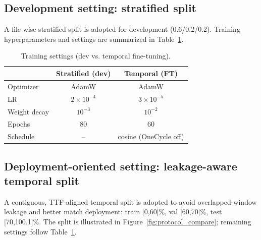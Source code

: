 \documentclass[pdflatex,sn-mathphys-num]{sn-jnl}%
\begin{document}
\subsection{Development setting: stratified split}
A file-wise stratified split is adopted for development (0.6/0.2/0.2). Training hyperparameters and settings are summarized in Table~\ref{tab:settings}.

\begin{table}[htbp]
\caption{Training settings (dev vs. temporal fine-tuning).}
\label{tab:settings}
\centering
\begin{tabular}{lcc}
\toprule
 & Stratified (dev) & Temporal (FT) \\
\midrule
Optimizer & AdamW & AdamW \\
LR & $2\times10^{-4}$ & $3\times10^{-5}$ \\
Weight decay & $10^{-3}$ & $10^{-2}$ \\
Epochs & 80 & 60 \\
Schedule & -- & cosine (OneCycle off) \\
\bottomrule
\end{tabular}
\end{table}

\subsection{Deployment-oriented setting: leakage-aware temporal split}
A contiguous, TTF-aligned temporal split is adopted to avoid overlapped-window leakage and better match deployment: train [0,60]\%, val [60,70]\%, test [70,100.1]\%. The split is illustrated in Figure~\ref{fig:protocol_compare}; remaining settings follow Table~\ref{tab:settings}.
\end{document}
